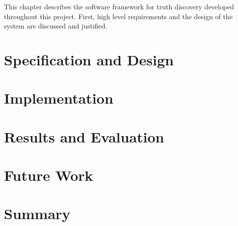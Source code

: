 \documentclass[../main.tex]{subfiles}
\begin{document}
This chapter describes the software framework for truth discovery developed
throughout this project. First, high level requirements and the design of the
system are discussed and justified.

\section{Specification and Design}


\section{Implementation}
\section{Results and Evaluation}
\section{Future Work}
\section{Summary}
\end{document}
